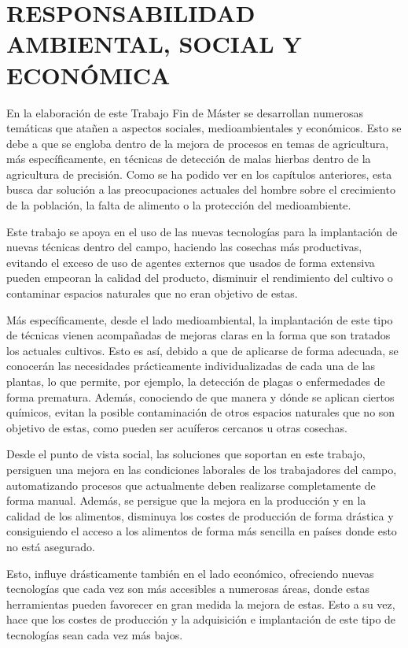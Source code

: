 %

\chapter{RESPONSABILIDAD AMBIENTAL, SOCIAL Y ECONÓMICA}
\label{sec:repercusion}

En la elaboración de este Trabajo Fin de Máster se desarrollan numerosas temáticas que atañen a aspectos sociales, medioambientales y económicos. Esto se debe a que se engloba dentro de la mejora de procesos en temas de agricultura, más específicamente, en técnicas de detección de malas hierbas dentro de la agricultura de precisión. Como se ha podido ver en los capítulos anteriores, esta busca dar solución a las preocupaciones actuales del hombre sobre el crecimiento de la población, la falta de alimento o la protección del medioambiente.

Este trabajo se apoya en el uso de las nuevas tecnologías para la implantación de nuevas técnicas dentro del campo, haciendo las cosechas más productivas, evitando el exceso de uso de agentes externos que usados de forma extensiva pueden empeoran la calidad del producto, disminuir el rendimiento del cultivo o contaminar espacios naturales que no eran objetivo de estas.

Más específicamente, desde el lado medioambiental, la implantación de este tipo de técnicas vienen acompañadas de mejoras claras en la forma que son tratados los actuales cultivos. Esto es así, debido a que de aplicarse de forma adecuada, se conocerán las necesidades prácticamente individualizadas de cada una de las plantas, lo que permite, por ejemplo, la detección de plagas o enfermedades de forma prematura. Además, conociendo de que manera y dónde se aplican ciertos químicos, evitan la posible contaminación de otros espacios naturales que no son objetivo de estas, como pueden ser acuíferos cercanos u otras cosechas.

Desde el punto de vista social, las soluciones que soportan en este trabajo, persiguen una mejora en las condiciones laborales de los trabajadores del campo, automatizando procesos que actualmente deben realizarse completamente de forma manual. Además, se persigue que la mejora en la producción y en la calidad de los alimentos, disminuya los costes de producción de forma drástica y consiguiendo el acceso a los alimentos de forma más sencilla en países donde esto no está asegurado.

Esto, influye drásticamente también en el lado económico, ofreciendo nuevas tecnologías que cada vez son más accesibles a numerosas áreas, donde estas herramientas pueden favorecer en gran medida la mejora de estas. Esto a su vez, hace que los costes de producción y la adquisición e implantación de este tipo de tecnologías sean cada vez más bajos.


